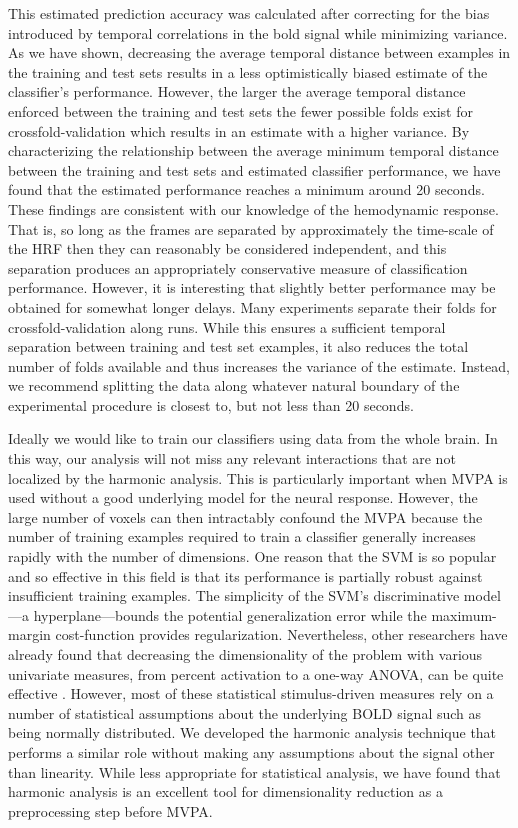 \documentclass[preprint,5p,authoryear]{elsarticle}
\begin{document}
This estimated prediction accuracy was calculated after correcting for the bias introduced by temporal correlations in the bold signal while minimizing variance.
As we have shown, decreasing the average temporal distance between examples in the training and test sets results in a less optimistically biased estimate of the classifier's performance.
However, the larger the average temporal distance enforced between the training and test sets the fewer possible folds exist for crossfold-validation which results in an estimate with a higher variance.
By characterizing the relationship between the average minimum temporal distance between the training and test sets and estimated classifier performance, we have found that the estimated performance reaches a minimum around 20 seconds.
These findings are consistent with our knowledge of the hemodynamic response.
That is, so long as the frames are separated by approximately the time-scale of the HRF then they can reasonably be considered independent, and this separation produces an appropriately conservative measure of classification performance. 
However, it is interesting that slightly better performance may be obtained for somewhat longer delays.
Many experiments separate their folds for crossfold-validation along runs.
While this ensures a sufficient temporal separation between training and test set examples, it also reduces the total number of folds available and thus increases the variance of the estimate.
Instead, we recommend splitting the data along whatever natural boundary of the experimental procedure is closest to, but not less than 20 seconds.

Ideally we would like to train our classifiers using data from the whole brain.
In this way, our analysis will not miss any relevant interactions that are not localized by the harmonic analysis.
This is particularly important when MVPA is used without a good underlying model for the neural response.
However, the large number of voxels can then intractably confound the MVPA because
the number of training examples required to train a classifier generally increases rapidly with the number of dimensions.
One reason that the SVM is so popular and so effective in this field is that its performance is partially robust against insufficient training examples.
The simplicity of the SVM's discriminative model---a hyperplane---bounds the potential generalization error while the maximum-margin cost-function provides regularization.
Nevertheless, other researchers have already found that decreasing the dimensionality of the problem with various univariate measures, from percent activation to a one-way ANOVA, can be quite effective \citep{Norman2006,Pereira2009}.
However, most of these statistical stimulus-driven measures rely on a number of statistical assumptions about the underlying BOLD signal such as being normally distributed.
We developed the harmonic analysis technique that performs a similar role without making any assumptions about the signal other than linearity.
While less appropriate for statistical analysis, we have found that harmonic analysis is an excellent tool for dimensionality reduction as a preprocessing step before MVPA.
\end{document}
